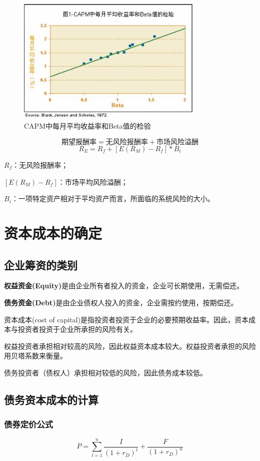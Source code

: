 \begin{figure}[H]
    \centering
    \includegraphics[width=0.8\textwidth]{image/CAPM中每月平均收益率和Beta值的检验.jpg}
    \caption{CAPM中每月平均收益率和Beta值的检验}
    \label{fig:11}
\end{figure}
$$\mbox{期望报酬率}=\mbox{无风险报酬率}+\mbox{市场风险溢酬}$$
$$R_E=R_f+[E(R_M)-R_f]*B_i$$

$R_f$：无风险报酬率；

$[E(R_M)-R_f]$：市场平均风险溢酬；

$B_i$：一项特定资产相对于平均资产而言，所面临的系统风险的大小。

\section{资本成本的确定}
\subsection{企业筹资的类别}
\textbf{权益资金(Equity)}是由企业所有者投入的资金，企业可长期使用，无需偿还。

\textbf{债务资金(Debt)}是由企业债权人投入的资金，企业需按约使用，按期偿还。

资本成本(cost of capital)是指投资者投资于企业的必要预期收益率。因此，资本成本与投资者投资于企业所承担的风险有关。

权益投资者承担相对较高的风险，因此权益资本成本较大。权益投资者承担的风险用贝塔系数来衡量。

债务投资者（债权人）承担相对较低的风险，因此债务成本较低。

\subsection{债务资本成本的计算}
\subsubsection{债券定价公式}
$$P=\sum_{t=1}^{n} \frac{I}{(1+r_D)^t}+\frac{F}{(1+r_D)^n}$$

